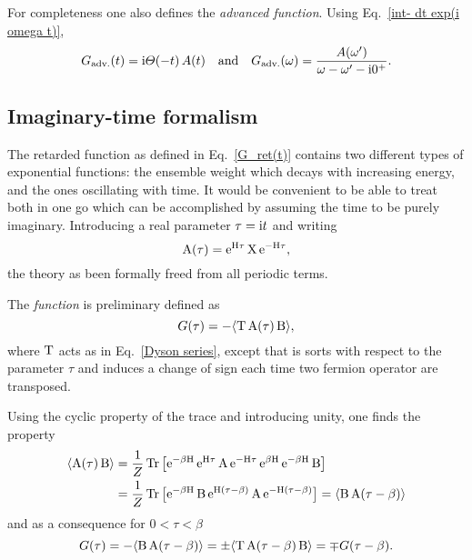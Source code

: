 For completeness one also defines the \emph{advanced  function}. Using Eq.~\ref{int- dt exp(i omega t)},
%
\begin{equation} \label{G_adv}
    G \sb{\text{adv.}} (t) = \mathrm i \varTheta(-t) \, A(t)
    \quad \text{and} \quad
    G \sb{\text{adv.}} (\omega) = \frac{A(\omega')}{\omega - \omega' - \mathrm i 0^+}.
\end{equation}

\subsection{Imaginary-time formalism}

The retarded  function as defined in Eq.~\ref{G_ret(t)} contains two
different types of exponential functions: the ensemble weight which decays with
increasing energy, and the ones oscillating with time. It would be convenient to
be able to treat both in one go which can be accomplished by assuming the time
to be purely imaginary. Introducing a real parameter $\tau = \mathrm i t$ and writing
%
\begin{equation*}
    \mathrm A(\tau) = \mathrm e^{\mathrm H \tau} \, \mathrm X \, \mathrm e^{-\mathrm H \tau},
\end{equation*}
%
the theory as been formally freed from all periodic terms.

The \emph{ function} is preliminary defined as
%
\begin{equation*}
    G(\tau) = -\langle\mathrm T \, \mathrm A(\tau) \, \mathrm B\rangle,
\end{equation*}
%
where $\mathrm T$ acts as in Eq.~\ref{Dyson series}, except that is sorts with
respect to the parameter $\tau$ and induces a change of sign each time two
fermion operator are transposed.

Using the cyclic property of the trace and introducing unity, one finds the
property
%
\begin{align*}
    \langle\mathrm A(\tau) \, \mathrm B\rangle &= \frac 1 Z \operatorname{Tr} \big[ \mathrm e^{-\beta \mathrm H} \,
    \mathrm e^{\mathrm H \tau} \, \mathrm A \, \mathrm e^{-\mathrm H \tau} \,
    \mathrm e^{\beta \mathrm H} \, \mathrm e^{-\beta \mathrm H} \, \mathrm B \big]
    \\
    &= \frac 1 Z \operatorname{Tr} \big[ \mathrm e^{-\beta \mathrm H} \, \mathrm B \,
    \mathrm e^{\mathrm H (\tau - \beta)} \, \mathrm A \, \mathrm e^{-\mathrm H (\tau - \beta)} \big]
    = \langle\mathrm B \, \mathrm A(\tau - \beta)\rangle
\end{align*}
%
and as a consequence for $0 < \tau < \beta$
%
\begin{equation} \label{(anti-) periodicity}
    G(\tau)
    = -\langle\mathrm B \, \mathrm A(\tau - \beta)\rangle
    = \pm \langle\mathrm T \, \mathrm A(\tau - \beta) \, \mathrm B\rangle
    = \mp G(\tau - \beta).
\end{equation}

